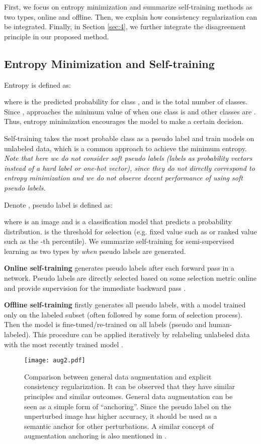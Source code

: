 \documentclass[preprint,review,10pt]{elsarticle}
\begin{document}
First, we focus on entropy minimization \cite{grandvalet2005semi} and summarize self-training methods as two types, online and offline. Then, we explain how consistency regularization can be integrated. Finally, in Section \ref{sec:4}, we further integrate the disagreement principle in our proposed method.

\subsection{Entropy Minimization and Self-training}
\label{sec:21}

Entropy  is defined as:

where  is the predicted probability for class , and  is the total number of classes. Since ,  approaches the minimum value of  when one class is  and other classes are . Thus, entropy minimization encourages the model to make a certain decision.

Self-training takes the most probable class as a pseudo label and train models on unlabeled data, which is a common approach to achieve the minimum entropy. \textit{Note that here we do not consider soft pseudo labels (labels as probability vectors instead of a hard label or one-hot vector), since they do not directly correspond to entropy minimization and we do not observe decent performance of using soft pseudo labels. } 

Denote , pseudo label  is defined as:

where  is an image and  is a classification model that predicts a probability distribution.  is the threshold for selection (e.g. fixed value such as  or ranked value such as the -th percentile). We summarize self-training for semi-supervised learning as two types by \textit{when} pseudo labels are generated.

\textbf{Online self-training} generates pseudo labels after each forward pass in a network. Pseudo labels are directly selected based on some selection metric online and provide supervision for the immediate backward pass \cite{lee2013pseudo}.

\textbf{Offline self-training} firstly generates all pseudo labels, with a model trained only on the labeled subset (often followed by some form of selection process). Then the model is fine-tuned/re-trained on all labels (pseudo and human-labeled). This procedure can be applied iteratively by relabeling unlabeled data with the most recently trained model \cite{cbst}.

\begin{figure}[t]
\centering
\texttt{[image: aug2.pdf]}
\caption{Comparison between general data augmentation and explicit consistency regularization. It can be observed that they have similar principles and similar outcomes. General data augmentation can be seen as a simple form of ``anchoring''. Since the pseudo label on the unperturbed image has higher accuracy, it should be used as a semantic anchor for other perturbations. A similar concept of augmentation anchoring is also mentioned in \cite{berthelot2020remixmatch}. }
\label{fig8}
\end{figure}
\end{document}
